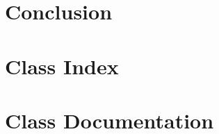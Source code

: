 \documentclass[twoside]{book}
\newcommand{\+}{\discretionary{\mbox{\scriptsize$\hookleftarrow$}}{}{}}
\newcommand{\clearemptydoublepage}{%
  \newpage{\pagestyle{empty}\cleardoublepage}%
}
\begin{document}
\chapter{Conclusion}


% 
\chapter{Class Index}

\chapter{Class Documentation}

























\backmatter
\newpage
{}
\clearemptydoublepage
{}
\printindex
\end{document}
